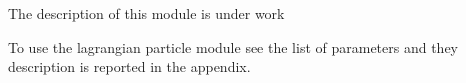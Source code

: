 The description of this module is under work

To use the lagrangian particle module see the list of parameters and they description 
is reported in the appendix.
